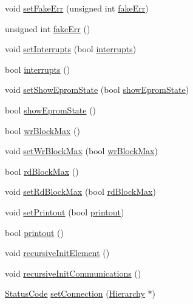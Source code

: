 \begin{DoxyCompactItemize}
\item 
void \hyperlink{classUsbFTInterface_aec057577db0b913beedf1e9896498e10}{set\+Fake\+Err} (unsigned int \hyperlink{classUsbFTInterface_abb29c7f73506259ef57d1e25204f8f7c}{fake\+Err})
\item 
unsigned int \hyperlink{classUsbFTInterface_abb29c7f73506259ef57d1e25204f8f7c}{fake\+Err} ()
\item 
void \hyperlink{classUsbFTInterface_a6fb31500f8a6adbd3d6f84f7932844da}{set\+Interrupts} (bool \hyperlink{classUsbFTInterface_a1831ba02d9707ded902af4cb1df8863f}{interrupts})
\item 
bool \hyperlink{classUsbFTInterface_a1831ba02d9707ded902af4cb1df8863f}{interrupts} ()
\item 
void \hyperlink{classUsbFTInterface_aff0c9289dfd34e05e472f2f115f78a01}{set\+Show\+Eprom\+State} (bool \hyperlink{classUsbFTInterface_a6e9b97244aaac289792fbef24daad33e}{show\+Eprom\+State})
\item 
bool \hyperlink{classUsbFTInterface_a6e9b97244aaac289792fbef24daad33e}{show\+Eprom\+State} ()
\item 
bool \hyperlink{classUsbFTInterface_ad73d2d990fdda96ee53566daaeb73abc}{wr\+Block\+Max} ()
\item 
void \hyperlink{classUsbFTInterface_ab2e58c22979ffa60adf609eca2af78d3}{set\+Wr\+Block\+Max} (bool \hyperlink{classUsbFTInterface_ad73d2d990fdda96ee53566daaeb73abc}{wr\+Block\+Max})
\item 
bool \hyperlink{classUsbFTInterface_a9f213ab1804e61af476bbdd3ade2d053}{rd\+Block\+Max} ()
\item 
void \hyperlink{classUsbFTInterface_a63615ac245f36dc6a298228d8dcd31c4}{set\+Rd\+Block\+Max} (bool \hyperlink{classUsbFTInterface_a9f213ab1804e61af476bbdd3ade2d053}{rd\+Block\+Max})
\item 
void \hyperlink{classUsbFTInterface_a6f31debb1d94a65deb3acb72e3608f27}{set\+Printout} (bool \hyperlink{classUsbFTInterface_ad312ac511dfb57c513f2998de396ba9b}{printout})
\item 
bool \hyperlink{classUsbFTInterface_ad312ac511dfb57c513f2998de396ba9b}{printout} ()
\item 
void \hyperlink{classElement_a3c0abcb36f8906688bb7e32608df7086}{recursive\+Init\+Element} ()
\item 
void \hyperlink{classElement_a82119ed37dff76508a2746a853ec35ba}{recursive\+Init\+Communications} ()
\item 
\hyperlink{classStatusCode}{Status\+Code} \hyperlink{classElement_ab476b4b1df5954141ceb14f072433b89}{set\+Connection} (\hyperlink{classHierarchy}{Hierarchy} $\ast$)

\end{DoxyCompactItemize}
